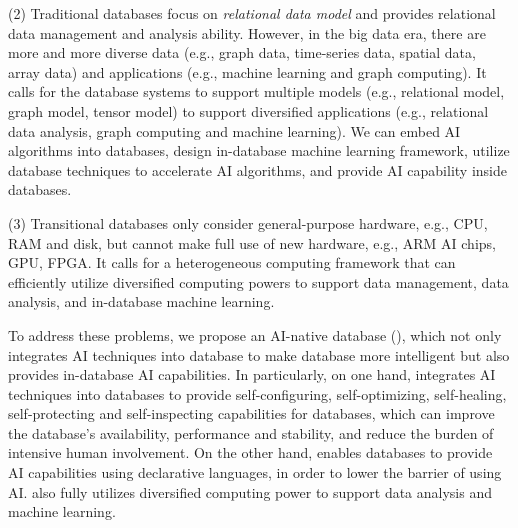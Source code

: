 

(2) Traditional databases focus on {\it relational data model} and provides relational data management and analysis ability. However, in the big data era, there are more and more diverse data (e.g., graph data, time-series data, spatial data, array data) and applications (e.g., machine learning and graph computing). It calls for the database systems to support multiple models (e.g., relational model, graph model, tensor model) to support diversified applications (e.g., relational data analysis, graph computing and machine learning). We can embed AI algorithms into databases, design in-database machine learning framework, utilize database techniques to accelerate AI algorithms, and provide AI capability inside databases.


(3) Transitional databases only consider general-purpose hardware, e.g., CPU, RAM and disk, but cannot make full use of new hardware, e.g., ARM AI chips, GPU, FPGA. It calls for a heterogeneous computing framework that can  efficiently utilize diversified computing powers to support data management, data analysis, and in-database machine learning. 



To address these problems, we propose an AI-native database (\oursys), which not only integrates AI techniques into database to make database more intelligent but also provides in-database AI capabilities. In particularly, on one hand, \oursys integrates AI techniques into databases to provide self-configuring, self-optimizing, self-healing, self-protecting and self-inspecting capabilities for databases, which can improve the database's availability, performance and stability, and reduce the burden of intensive human involvement. On the other hand, \oursys enables databases to provide AI capabilities using declarative languages, in order to lower the barrier of using AI. \oursys also fully utilizes diversified computing power to support data analysis and machine learning. 


